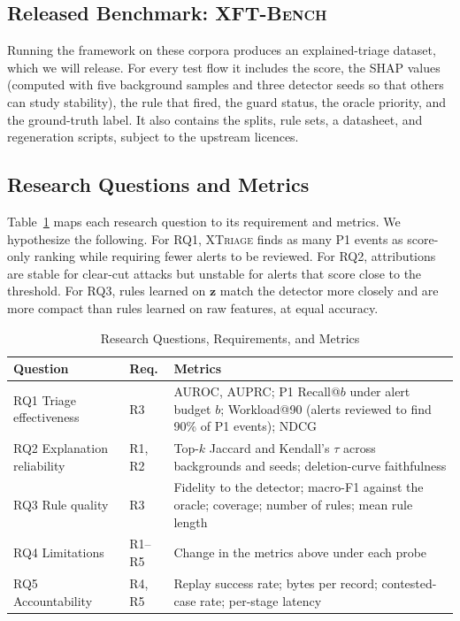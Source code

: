 \documentclass[journal]{IEEEtran}
\begin{document}
\subsection{Released Benchmark: \textsc{XFT-Bench}}
Running the framework on these corpora produces an explained-triage dataset, which we will release. For every test flow it includes the score, the SHAP values (computed with five background samples and three detector seeds so that others can study stability), the rule that fired, the guard status, the oracle priority, and the ground-truth label. It also contains the splits, rule sets, a datasheet, and regeneration scripts, subject to the upstream licences.

\subsection{Research Questions and Metrics}
Table~\ref{tab:rq} maps each research question to its requirement and metrics. We hypothesize the following. For RQ1, \textsc{XTriage} finds as many P1 events as score-only ranking while requiring fewer alerts to be reviewed. For RQ2, attributions are stable for clear-cut attacks but unstable for alerts that score close to the threshold. For RQ3, rules learned on $\mathbf{z}$ match the detector more closely and are more compact than rules learned on raw features, at equal accuracy.

\begin{table}[t]
\centering
\caption{Research Questions, Requirements, and Metrics}
\label{tab:rq}
\footnotesize
\setlength{\tabcolsep}{3pt}
\begin{tabular}{@{}p{22mm}p{8.5mm}p{53mm}@{}}
\toprule
Question & Req. & Metrics\\
\midrule
RQ1 Triage effectiveness & R3 & AUROC, AUPRC; P1 Recall@$b$ under alert budget $b$; Workload@90 (alerts reviewed to find 90\% of P1 events); NDCG\\
RQ2 Explanation reliability & R1, R2 & Top-$k$ Jaccard and Kendall's $\tau$ across backgrounds and seeds; deletion-curve faithfulness\\
RQ3 Rule quality & R3 & Fidelity to the detector; macro-F1 against the oracle; coverage; number of rules; mean rule length\\
RQ4 Limitations & R1--R5 & Change in the metrics above under each probe\\
RQ5 Accountability & R4, R5 & Replay success rate; bytes per record; contested-case rate; per-stage latency\\
\bottomrule
\end{tabular}
\end{table}
\end{document}
